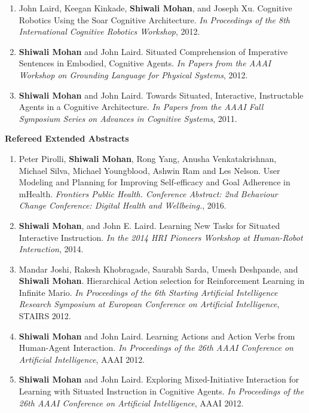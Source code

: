 \documentclass[margin,line,11pt]{res}
\begin{document}
\begin{resume}
\begin{enumerate}[label=\lbrack W\arabic*\rbrack:,leftmargin=*]
\item John Laird, Keegan Kinkade, \textbf{Shiwali Mohan}, and Joseph Xu. Cognitive Robotics Using the Soar Cognitive Architecture. \emph{In Proceedings of the 8th International Cognitive Robotics Workshop}, 2012.

\item \textbf{Shiwali Mohan} and John Laird. Situated Comprehension of Imperative Sentences in Embodied, Cognitive Agents. \emph{In Papers from the AAAI Workshop on Grounding Language for Physical Systems}, 2012.
  
\item \textbf{Shiwali Mohan} and John Laird. Towards Situated, Interactive, Instructable Agents in a Cognitive Architecture. \emph{In Papers from the AAAI Fall Symposium Series on Advances in Cognitive Systems}, 2011.
\end{enumerate}

\textbf{Refereed Extended Abstracts}
\begin{enumerate}[label=\lbrack A\arabic*\rbrack,leftmargin=*]
\item Peter Pirolli, \textbf{Shiwali Mohan}, Rong Yang, Anusha Venkatakrishnan, Michael Silva, Michael Youngblood, Ashwin Ram and Les Nelson. User Modeling and Planning for Improving Self-efficacy and Goal Adherence in mHealth. \emph{Frontiers Public Health. Conference Abstract: 2nd Behaviour Change Conference: Digital Health and Wellbeing.}, 2016.
\item \textbf{Shiwali Mohan}, and John E. Laird. Learning New Tasks for Situated Interactive Instruction. \emph{In the 2014 HRI Pioneers Workshop at Human-Robot Interaction}, 2014.
\item Mandar Joshi, Rakesh Khobragade, Saurabh Sarda, Umesh Deshpande, and \textbf{Shiwali Mohan}. Hierarchical Action selection for Reinforcement Learning in Infinite Mario. \emph{In Proceedings of the 6th Starting Artificial Intelligence Research Symposium at European Conference on Artificial Intelligence}, STAIRS 2012.

\item \textbf{Shiwali Mohan} and John Laird. Learning Actions and Action Verbs from Human-Agent Interaction. \emph{In Proceedings of the 26th AAAI Conference on Artificial Intelligence}, AAAI 2012.

\item \textbf{Shiwali Mohan} and John Laird. Exploring Mixed-Initiative Interaction for Learning with Situated Instruction in Cognitive Agents. \emph{In Proceedings of the 26th AAAI Conference on Artificial Intelligence}, AAAI 2012.


\end{enumerate}
\end{resume}
\end{document}
